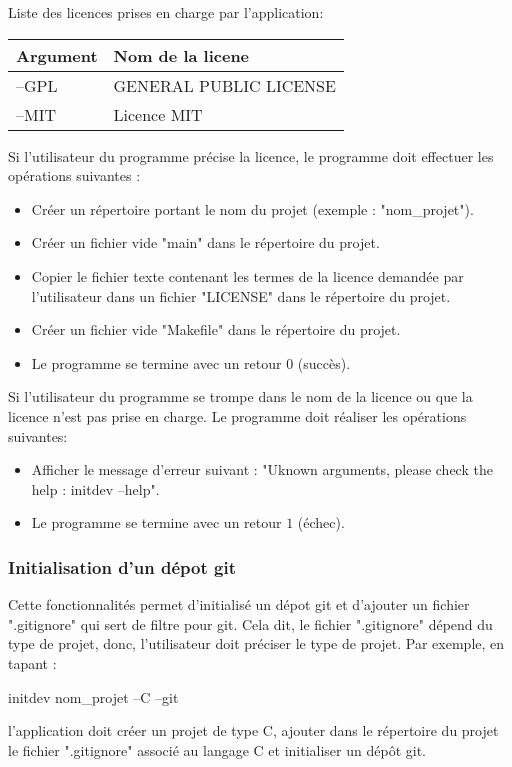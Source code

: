 \documentclass[10pt,a4paper]{article}
\begin{document}
  Liste des licences prises en charge par l'application:
  \begin{center}
  \begin{tabular}{l|l}
    Argument & Nom de la licene \\ \hline
    --GPL & GENERAL PUBLIC LICENSE \\
    --MIT & Licence MIT \\
  \end{tabular}
\end{center}

Si l'utilisateur du programme précise la licence, le programme doit effectuer les opérations suivantes :
  \begin{itemize}
    \item Créer un répertoire portant le nom du projet (exemple : "nom\_projet").
    \item Créer un fichier vide "main" dans le répertoire du projet.
    \item Copier le fichier texte contenant les termes de la licence demandée par l'utilisateur dans un fichier "LICENSE" dans le  répertoire du projet.
    \item Créer un fichier vide "Makefile" dans le  répertoire du projet.
    \item Le programme se termine avec un retour $0$ (succès).
  \end{itemize}

  Si l'utilisateur du programme se trompe dans le nom de la licence ou que la licence n'est pas prise en charge. Le programme doit réaliser les opérations suivantes:
  \begin{itemize}
    \item Afficher le message d'erreur suivant : "Uknown arguments, please check the help : initdev --help".
    \item Le programme se termine avec un retour $1$ (échec). 
\end{itemize}

\subsubsection{Initialisation d'un dépot git}
  Cette fonctionnalités permet d'initialisé un dépot git et d'ajouter un fichier ".gitignore" qui sert de filtre pour git. Cela dit, le fichier ".gitignore" dépend du type de projet, donc, l'utilisateur doit préciser le type de projet. Par exemple, en tapant :
  \begin{center}
    initdev nom\_projet --C --git
  \end{center}
  l'application doit créer un projet de type C, ajouter dans le répertoire du projet le fichier ".gitignore" associé au langage C et initialiser un dépôt git.
\end{document}

